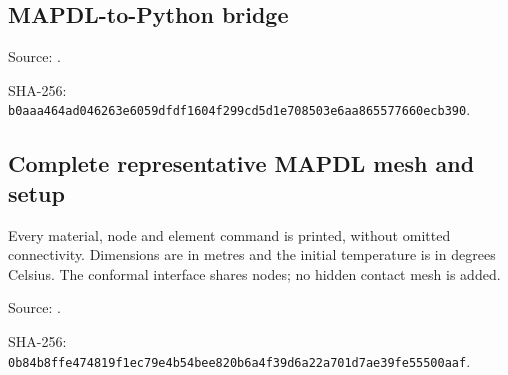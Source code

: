 \documentclass[oneside,openany]{amsdtx}
\begin{document}
\clearpage\subsection{MAPDL-to-Python bridge}


{\footnotesize\noindent Source: .\par\noindent SHA-256: \texttt{b0aaa464ad046263e6059dfdf1604f299cd5d1e708503e6aa865577660ecb390}.\par}


\clearpage\subsection{Complete representative MAPDL mesh and setup}
Every material, node and element command is printed, without omitted connectivity. Dimensions are in metres and the initial temperature is in degrees Celsius. The conformal interface shares nodes; no hidden contact mesh is added.

{\footnotesize\noindent Source: .\par\noindent SHA-256: \texttt{0b84b8ffe474819f1ec79e4b54bee820b6a4f39d6a22a701d7ae39fe55500aaf}.\par}

\end{document}
